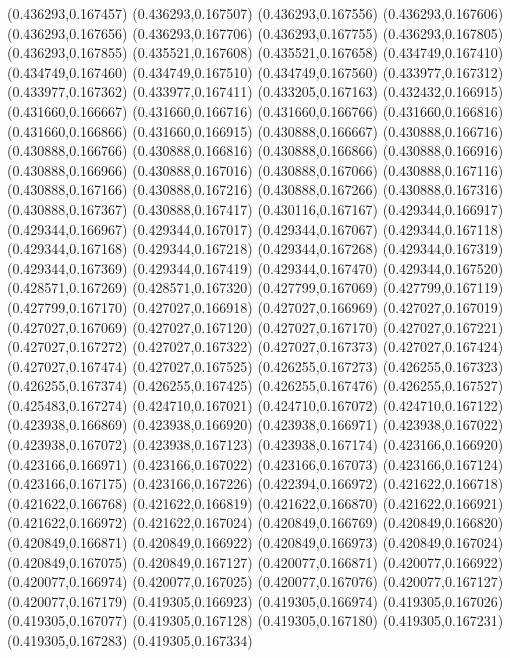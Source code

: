 (0.436293,0.167457)
(0.436293,0.167507)
(0.436293,0.167556)
(0.436293,0.167606)
(0.436293,0.167656)
(0.436293,0.167706)
(0.436293,0.167755)
(0.436293,0.167805)
(0.436293,0.167855)
(0.435521,0.167608)
(0.435521,0.167658)
(0.434749,0.167410)
(0.434749,0.167460)
(0.434749,0.167510)
(0.434749,0.167560)
(0.433977,0.167312)
(0.433977,0.167362)
(0.433977,0.167411)
(0.433205,0.167163)
(0.432432,0.166915)
(0.431660,0.166667)
(0.431660,0.166716)
(0.431660,0.166766)
(0.431660,0.166816)
(0.431660,0.166866)
(0.431660,0.166915)
(0.430888,0.166667)
(0.430888,0.166716)
(0.430888,0.166766)
(0.430888,0.166816)
(0.430888,0.166866)
(0.430888,0.166916)
(0.430888,0.166966)
(0.430888,0.167016)
(0.430888,0.167066)
(0.430888,0.167116)
(0.430888,0.167166)
(0.430888,0.167216)
(0.430888,0.167266)
(0.430888,0.167316)
(0.430888,0.167367)
(0.430888,0.167417)
(0.430116,0.167167)
(0.429344,0.166917)
(0.429344,0.166967)
(0.429344,0.167017)
(0.429344,0.167067)
(0.429344,0.167118)
(0.429344,0.167168)
(0.429344,0.167218)
(0.429344,0.167268)
(0.429344,0.167319)
(0.429344,0.167369)
(0.429344,0.167419)
(0.429344,0.167470)
(0.429344,0.167520)
(0.428571,0.167269)
(0.428571,0.167320)
(0.427799,0.167069)
(0.427799,0.167119)
(0.427799,0.167170)
(0.427027,0.166918)
(0.427027,0.166969)
(0.427027,0.167019)
(0.427027,0.167069)
(0.427027,0.167120)
(0.427027,0.167170)
(0.427027,0.167221)
(0.427027,0.167272)
(0.427027,0.167322)
(0.427027,0.167373)
(0.427027,0.167424)
(0.427027,0.167474)
(0.427027,0.167525)
(0.426255,0.167273)
(0.426255,0.167323)
(0.426255,0.167374)
(0.426255,0.167425)
(0.426255,0.167476)
(0.426255,0.167527)
(0.425483,0.167274)
(0.424710,0.167021)
(0.424710,0.167072)
(0.424710,0.167122)
(0.423938,0.166869)
(0.423938,0.166920)
(0.423938,0.166971)
(0.423938,0.167022)
(0.423938,0.167072)
(0.423938,0.167123)
(0.423938,0.167174)
(0.423166,0.166920)
(0.423166,0.166971)
(0.423166,0.167022)
(0.423166,0.167073)
(0.423166,0.167124)
(0.423166,0.167175)
(0.423166,0.167226)
(0.422394,0.166972)
(0.421622,0.166718)
(0.421622,0.166768)
(0.421622,0.166819)
(0.421622,0.166870)
(0.421622,0.166921)
(0.421622,0.166972)
(0.421622,0.167024)
(0.420849,0.166769)
(0.420849,0.166820)
(0.420849,0.166871)
(0.420849,0.166922)
(0.420849,0.166973)
(0.420849,0.167024)
(0.420849,0.167075)
(0.420849,0.167127)
(0.420077,0.166871)
(0.420077,0.166922)
(0.420077,0.166974)
(0.420077,0.167025)
(0.420077,0.167076)
(0.420077,0.167127)
(0.420077,0.167179)
(0.419305,0.166923)
(0.419305,0.166974)
(0.419305,0.167026)
(0.419305,0.167077)
(0.419305,0.167128)
(0.419305,0.167180)
(0.419305,0.167231)
(0.419305,0.167283)
(0.419305,0.167334)

